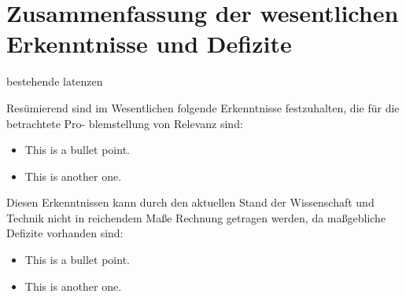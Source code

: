 \section{Zusammenfassung der wesentlichen Erkenntnisse und Defizite}\label{sec:grundlagensummary}

bestehende latenzen


Resümierend sind im Wesentlichen folgende Erkenntnisse festzuhalten, die für die betrachtete Pro-
blemstellung von Relevanz sind:
\begin{itemize}
	\item This is a bullet point.
    \item This is another one.
\end{itemize}

Diesen Erkenntnissen kann durch den aktuellen Stand der Wissenschaft und Technik nicht in
reichendem Maße Rechnung getragen werden, da maßgebliche Defizite vorhanden sind:
\begin{itemize}
	\item This is a bullet point.
    \item This is another one.
\end{itemize}